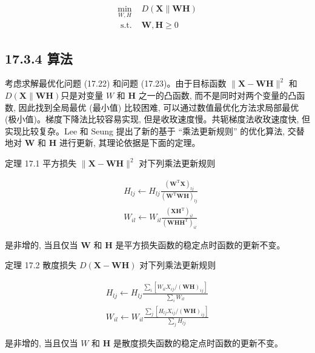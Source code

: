 \documentclass[10pt]{article}
\begin{document}
\[
\begin{array}{ll}
\min _{W, H} & D(\boldsymbol{X} \| \boldsymbol{W} \boldsymbol{H})  \tag{17.23}\\
\text { s.t. } & \boldsymbol{W}, \boldsymbol{H} \geqslant 0
\end{array}
\]

\subsection*{17.3.4 算法}
考虑求解最优化问题 (17.22) 和问题 (17.23)。由于目标函数 $\|\boldsymbol{X}-\boldsymbol{W} \boldsymbol{H}\|^{2}$ 和 $D(\boldsymbol{X} \| \boldsymbol{W} \boldsymbol{H})$只是对变量 $W$ 和 $\boldsymbol{H}$ 之一的凸函数, 而不是同时对两个变量的凸函数, 因此找到全局最优 (最小值) 比较困难, 可以通过数值最优化方法求局部最优 (极小值)。梯度下降法比较容易实现, 但是收玫速度慢。共轭梯度法收玫速度快, 但实现比较复杂。Lee 和 Seung 提出了新的基于 “乘法更新规则” 的优化算法, 交替地对 $\boldsymbol{W}$ 和 $\boldsymbol{H}$ 进行更新, 其理论依据是下面的定理。

定理 17.1 平方损失 $\|\boldsymbol{X}-\boldsymbol{W} \boldsymbol{H}\|^{2}$ 对下列乘法更新规则


\begin{align*}
& H_{l j} \leftarrow H_{l j} \frac{\left(\boldsymbol{W}^{\mathrm{T}} \boldsymbol{X}\right)_{l j}}{\left(\boldsymbol{W}^{\mathrm{T}} \boldsymbol{W} \boldsymbol{H}\right)_{l j}}  \tag{17.24}\\
& W_{i l} \leftarrow W_{i l} \frac{\left(\boldsymbol{X} \boldsymbol{H}^{\mathrm{T}}\right)_{i l}}{\left(\boldsymbol{W} \boldsymbol{H} \boldsymbol{H}^{\mathrm{T}}\right)_{i l}} \tag{17.25}
\end{align*}


是非增的, 当且仅当 $\boldsymbol{W}$ 和 $\boldsymbol{H}$ 是平方损失函数的稳定点时函数的更新不变。

定理 17.2 散度损失 $D(\boldsymbol{X}-\boldsymbol{W} \boldsymbol{H})$ 对下列乘法更新规则

\[
\begin{array}{r}
H_{l j} \leftarrow H_{l j} \frac{\sum_{i}\left[W_{i l} X_{i j} /(\boldsymbol{W} \boldsymbol{H})_{i j}\right]}{\sum_{i} W_{i l}} \\
W_{i l} \leftarrow W_{i l} \frac{\sum_{j}\left[H_{l j} X_{i j} /(\boldsymbol{W} \boldsymbol{H})_{i j}\right]}{\sum_{j} H_{l j}} \tag{17.27}
\end{array}
\]

是非增的, 当且仅当 $W$ 和 $\boldsymbol{H}$ 是散度损失函数的稳定点时函数的更新不变。
\end{document}
